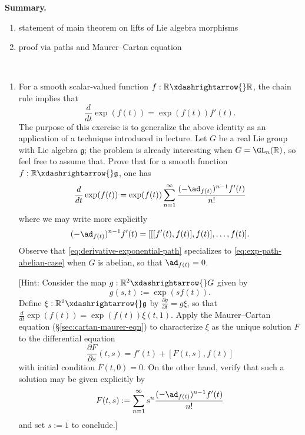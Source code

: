 \documentclass[reqno]{amsart} 
\begin{document}
\textbf{Summary.}
\begin{enumerate}
\item statement of main theorem on lifts of Lie algebra morphisms
\item proof via paths and Maurer--Cartan equation
\end{enumerate}
\begin{homework}~\label{hw:diff-exp}
  \begin{enumerate}
  \item
    For a smooth scalar-valued function
    $f : \mathbb{R} \xdashrightarrow{} \mathbb{R}$,
    the chain rule implies that
    \begin{equation}\label{eq:exp-path-abelian-case}
            \frac{d}{d t} \exp(f(t))
      = \exp(f(t)) f'(t).
    \end{equation}
    The purpose of this exercise is to
    generalize
    the above identity as an application of a technique introduced in lecture.
    Let $G$ be a real Lie group with Lie algebra $\mathfrak{g}$;
    the problem is already interesting when
    $G = \GL_n(\mathbb{R})$, so feel free to assume that.  
    Prove that for a smooth function
    $f : \mathbb{R} \xdashrightarrow{} \mathfrak{g}$,
    one has
    \begin{equation}\label{eq:derivative-exponential-path}
      \frac{d}{d t} \exp(f(t))
      =
      \exp(f(t))
      \sum_{n=1}^{\infty}
      \frac{
        (- \ad_{f(t)})^{n-1} f'(t)
      }{n!}
    \end{equation}
    where we may write more explicitly
    \begin{equation*}
      (- \ad_{f(t)})^{n-1} f'(t)
      = [[[f'(t), f(t)], f(t)], \dotsc, f(t)].
    \end{equation*}
    Observe that
    \eqref{eq:derivative-exponential-path}
    specializes
    to \eqref{eq:exp-path-abelian-case}
    when $G$ is abelian,
    so that $\ad_{f(t)} = 0$.

    [Hint:
    Consider the map
    $g : \mathbb{R}^2 \xdashrightarrow{} G$
    given by
    \begin{equation*}
      g(s,t) := \exp(s f(t)).
    \end{equation*}
    Define $\xi : \mathbb{R}^2 \xdashrightarrow{}\mathfrak{g}$
    by $\frac{\partial g}{\partial t} = g \xi$,
    so that $\frac{d}{d t} \exp(f(t))
    = \exp(f(t)) \xi(t,1)$.
    Apply the Maurer--Cartan equation (\S\ref{sec:cartan-maurer-eqn})
    to characterize $\xi$ as the unique
    solution $F$ to the differential equation
    \begin{equation*}
      \frac{\partial F}{\partial s}(t,s)
      = f'(t)
      + [F(t,s), f(t)]
    \end{equation*}
    with initial condition $F(t,0) = 0$.
    On the other hand, verify that such a solution
    may be given explicitly by
    \begin{equation*}
      F(t,s) :=
      \sum_{n=1}^{\infty}
      s^n
      \frac{
        (- \ad_{f(t)})^{n-1} f'(t)
      }{n!}
    \end{equation*}
    and set $s := 1$ to conclude.]
  \end{enumerate}
\end{homework}
\end{document}

